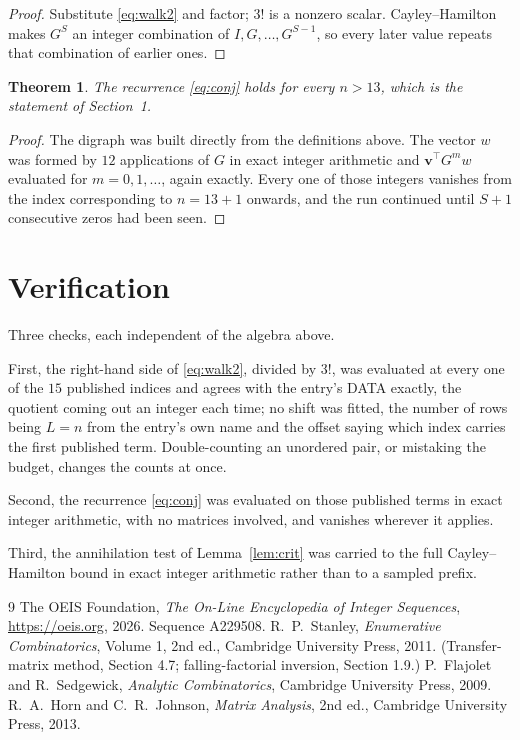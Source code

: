 \documentclass[11pt,a4paper]{article}
\theoremstyle{plain}
\newtheorem{theorem}{Theorem}
\theoremstyle{definition}
\begin{document}
\begin{proof}
Substitute \eqref{eq:walk2} and factor; $3!$ is a nonzero scalar. Cayley--Hamilton
makes $G^{S}$ an integer combination of $I,G,\dots,G^{S-1}$, so every later value repeats
that combination of earlier ones.
\end{proof}

\begin{theorem}
The recurrence \eqref{eq:conj} holds for every $n>13$, which is the statement of
Section~1.
\end{theorem}

\begin{proof}
The digraph was built directly from the definitions above. The vector $w$ was formed by
$12$ applications of $G$ in exact integer arithmetic and $\mathbf{v}^{\!\top}G^{m}w$
evaluated for $m=0,1,\dots$, again exactly. Every one of those integers vanishes from the
index corresponding to $n=13+1$ onwards, and the run continued until $S+1$ consecutive
zeros had been seen.
\end{proof}

\section{Verification}

Three checks, each independent of the algebra above.

First, the right-hand side of \eqref{eq:walk2}, divided by $3!$, was evaluated at every
one of the $15$ published indices and agrees with the entry's DATA exactly, the quotient
coming out an integer each time; no shift was fitted, the number of rows being $L=n$
from the entry's own name and the offset saying which index carries the first published term.
Double-counting an unordered pair, or mistaking the budget, changes the counts at once.

Second, the recurrence \eqref{eq:conj} was evaluated on those published terms in exact
integer arithmetic, with no matrices involved, and vanishes wherever it applies.

Third, the annihilation test of Lemma~\ref{lem:crit} was carried to the full
Cayley--Hamilton bound in exact integer arithmetic rather than to a sampled prefix.

\begin{thebibliography}{9}
 The OEIS Foundation, \emph{The On-Line Encyclopedia of Integer
Sequences}, \url{https://oeis.org}, 2026. Sequence A229508.
 R.~P.~Stanley, \emph{Enumerative Combinatorics}, Volume 1, 2nd ed.,
Cambridge University Press, 2011. (Transfer-matrix method, Section 4.7; falling-factorial
inversion, Section 1.9.)
 P.~Flajolet and R.~Sedgewick, \emph{Analytic Combinatorics}, Cambridge
University Press, 2009.
 R.~A.~Horn and C.~R.~Johnson, \emph{Matrix Analysis}, 2nd ed., Cambridge
University Press, 2013.
\end{thebibliography}
\end{document}
